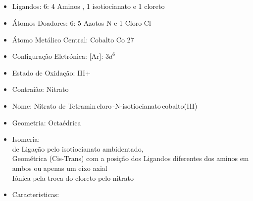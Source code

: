 \documentclass[12pt]{article}
\begin{document}
	\subsection{}
	\begin{itemize}
   
   
   \item Ligandos: 6:
   	4 Aminos ,
		1 isotiocianato  e 
		1 cloreto 
   
   
   \item Átomos Doadores: 6:
   	5 Azotos N e
		1 Cloro Cl
   
   \item Átomo Metálico Central: Cobalto Co 27
   
   \item Configuração Eletrónica: [Ar]: $ 3d^6 $
   
   \item Estado de Oxidação: III+
   
   \item Contraião: Nitrato 
   
   \item Nome: 
   	Nitrato de Tetramin\,cloro\,-N-isotiocianato\,cobalto(III)
   
   \item Geometria: Octaédrica
   
   \item Isomeria:\\
   	de Ligação pelo isotiocianato ambidentado,\\
		Geométrica (Cis-Trans) com a posição dos Ligandos diferentes dos aminos em ambos ou apenas um eixo axial\\
		Iônica pela troca do cloreto pelo nitrato

	\item Caracteristicas:

	\end{itemize}
	
\break


	
\end{document}
